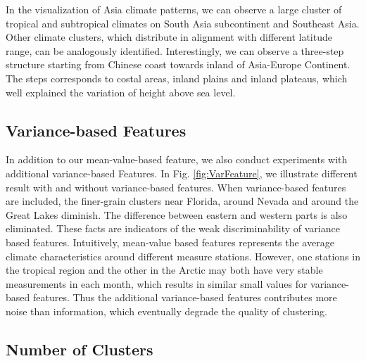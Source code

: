 In the visualization of Asia climate patterns, we can observe a large cluster of tropical and subtropical climates on South Asia subcontinent and Southeast Asia. Other climate clusters, which distribute in alignment with different latitude range, can be analogously identified. Interestingly, we can observe a three-step structure starting from Chinese coast towards inland of Asia-Europe Continent. The steps corresponds to costal areas, inland plains and inland plateaus, which well explained the variation of height above sea level.

\subsection{Variance-based Features}
In addition to our mean-value-based feature, we also conduct experiments with additional variance-based Features. In Fig. \ref{fig:VarFeature}, we illustrate different result with and without variance-based features. When variance-based features are included, the finer-grain clusters near Florida, around Nevada and around the Great Lakes diminish. The difference between eastern and western parts is also eliminated. These facts are indicators of the weak discriminability of variance based features. Intuitively, mean-value based features represents the average climate characteristics around different measure stations. However, one stations in the tropical region and the other in the Arctic may both have very stable measurements in each month, which results in similar small values for variance-based features. Thus the additional variance-based features contributes more noise than information, which eventually degrade the quality of clustering.

\subsection{Number of Clusters}

